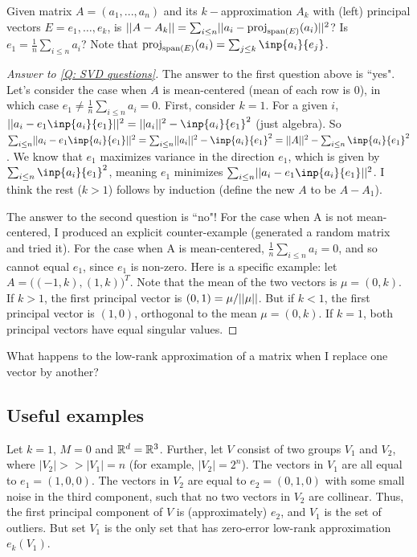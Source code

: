 \documentclass{article}
\begin{document}
\begin{question}\label{Q: SVD questions}
    Given matrix $A = (a_1,...,a_n)$ and its $k-$approximation $A_k$ with (left) principal vectors $E = e_1,\dots,e_k$, is $\norm{A - A_k} = \sum_{i\leq n}\norm{a_i - \proj_{\vspan{E}}(a_i)}^2$? Is $e_1 = \frac{1}{n}\sum_{i\leq n}a_i$? Note that $\proj_{\vspan{E}}(a_i) = \sum_{j\leq k}\inp{a_i}{e_j}$.
\end{question}
\begin{proof}[Answer to \ref{Q: SVD questions}]
The answer to the first question above is ``yes". Let's consider the case when $A$ is mean-centered (mean of each row is 0), in which case $e_1 \neq \frac{1}{n}\sum_{i\leq n}a_i = 0$. First, consider $k=1$. For a given $i$, $\norm{a_i - e_1\inp{a_i}{e_1}}^2 = \norm{a_i}^2 - \inp{a_i}{e_1}^2$ (just algebra). So $\sum_{i\leq n}\norm{a_i - e_1\inp{a_i}{e_1}}^2 = \sum_{i\leq n}\norm{a_i}^2 - \inp{a_i}{e_1}^2 = \norm{A}^2-\sum_{i\leq n}\inp{a_i}{e_1}^2$. We know that $e_1$ maximizes variance in the direction $e_1$, which is given by $\sum_{i\leq n} \inp{a_i}{e_1}^2$, meaning $e_1$ minimizes $\sum_{i\leq n}\norm{a_i - e_1\inp{a_i}{e_1}}^2$. I think the rest ($k>1$) follows by induction (define the new $A$ to be $A-A_1$).

The answer to the second question is ``no"! For the case when A is not mean-centered, I produced an explicit counter-example (generated a random matrix and tried it). For the case when A is mean-centered, $\frac{1}{n}\sum_{i\leq n}a_i = 0$, and so cannot equal $e_1$, since $e_1$ is non-zero. Here is a specific example: let $A = \Big((-1,k),(1,k)\Big)^T$. Note that the mean of the two vectors is $\mu=(0,k)$. If $k>1$, the first principal vector is $(0,1) = \mu/||\mu||$. But if $k<1$, the first principal vector is $(1,0)$, orthogonal to the mean $\mu=(0,k)$. If $k=1$, both principal vectors have equal singular values.
\end{proof}
\begin{question}
    What happens to the low-rank approximation of a matrix when I replace one vector by another?
\end{question}

\subsection{Useful examples}
Let $k = 1$, $M = 0$ and $\mathbb{R}^d = \mathbb{R}^3$. Further, let $V$ consist of two groups $V_1$ and $V_2$, where $|V_2| >> |V_1| = n$ (for example, $|V_2|=2^n$). The vectors in $V_1$ are all equal to $e_1 = (1,0,0)$. The vectors in $V_2$ are equal to $e_2=(0,1,0)$ with some small noise in the third component, such that no two vectors in $V_2$ are collinear. Thus, the first principal component of $V$ is (approximately) $e_2$, and $V_1$ is the set of outliers. But set $V_1$ is the only set that has zero-error low-rank approximation $e_k(V_1)$.
\end{document}
